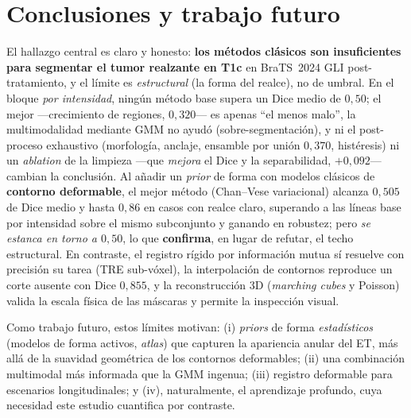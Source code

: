 \documentclass[conference]{IEEEtran}
\begin{document}
\section{Conclusiones y trabajo futuro}
\label{sec:conclusiones}
El hallazgo central es claro y honesto: \textbf{los métodos
clásicos son insuficientes para segmentar el tumor realzante en T1c}
en BraTS~2024 GLI post-tratamiento, y el límite es \emph{estructural}
(la forma del realce), no de umbral. En el bloque \emph{por intensidad},
ningún método base supera un Dice medio de $0{,}50$; el mejor
---crecimiento de regiones, $0{,}320$--- es apenas ``el menos malo'', la
multimodalidad mediante GMM no ayudó (sobre-segmentación), y ni el
post-proceso exhaustivo (morfología, anclaje, ensamble por unión
$0{,}370$, histéresis) ni un \emph{ablation} de la limpieza ---que
\emph{mejora} el Dice y la separabilidad, $+0{,}092$--- cambian la
conclusión. Al añadir un \emph{prior} de forma con modelos clásicos de
\textbf{contorno deformable}, el mejor método (Chan--Vese variacional)
alcanza $0{,}505$ de Dice medio y hasta $0{,}86$ en casos con realce
claro, superando a las líneas base por intensidad sobre el mismo
subconjunto y ganando en robustez; pero \emph{se estanca en torno a
$0{,}50$}, lo que \textbf{confirma}, en lugar de refutar, el techo
estructural. En contraste, el registro rígido por información mutua sí
resuelve con precisión su tarea (TRE sub-vóxel), la interpolación de
contornos reproduce un corte ausente con Dice $0{,}855$, y la
reconstrucción 3D (\textit{marching cubes} y Poisson) valida la escala
física de las máscaras y permite la inspección visual.

Como trabajo futuro, estos límites motivan: (i) \emph{priors} de forma
\emph{estadísticos} (modelos de forma activos, \textit{atlas}) que
capturen la apariencia anular del ET, más allá de la suavidad geométrica
de los contornos deformables; (ii) una combinación multimodal más
informada que la GMM ingenua; (iii) registro deformable para escenarios
longitudinales; y (iv), naturalmente, el aprendizaje profundo, cuya
necesidad este estudio cuantifica por contraste.
\end{document}
